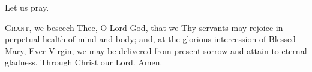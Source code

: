 {\centering Let us pray.\par}

\lettrine{G}{rant,} we beseech Thee, O Lord God, that we Thy servants
may rejoice in perpetual health of mind and body; 
and, at the glorious intercession of Blessed Mary, Ever-Virgin, 
we may be delivered from present sorrow and attain to eternal gladness.  
Through Christ our Lord.
\Rbar Amen.

